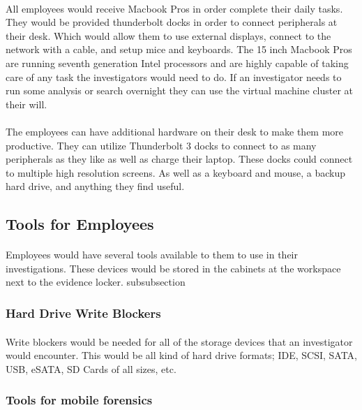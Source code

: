 \documentclass[12pt]{article}
\begin{document}
\paragraph{}
All employees would receive Macbook Pros in order complete their daily tasks.
They would be provided thunderbolt docks in order to connect peripherals at their desk.
Which would allow them to use external displays, connect to the network with a cable, and setup mice and keyboards.
The 15 inch Macbook Pros are running seventh generation Intel processors and are highly capable of taking care of any task the investigators would need to do. 
If an investigator needs to run some analysis or search overnight they can use the virtual machine cluster at their will.
\paragraph{}
The employees can have additional hardware on their desk to make them more productive.
They can utilize Thunderbolt 3 docks to connect to as many peripherals as they like as well as charge their laptop.
These docks could connect to multiple high resolution screens. As well as a keyboard and mouse, a backup hard drive, and anything they find useful.

 
\subsection{Tools for Employees} 
\paragraph{}
Employees would have several tools available to them to use in their investigations.
These devices would be stored in the cabinets at the workspace next to the evidence locker.
subsubsection
\subsubsection{Hard Drive Write Blockers}
\paragraph{}
Write blockers would be needed for all of the storage devices that an investigator would encounter.
This would be all kind of hard drive formats; IDE, SCSI, SATA, USB, eSATA, SD Cards of all sizes, etc.
\subsubsection{Tools for mobile forensics}
\end{document}
